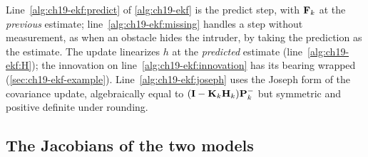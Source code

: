 \begin{algorithm}[htb]
\caption{One step of the extended Kalman filter}
\label{alg:ch19-ekf}
\end{algorithm}

Line~\ref{alg:ch19-ekf:predict} of \cref{alg:ch19-ekf} is the predict step,
with $\mathbf{F}_k$ at the \emph{previous} estimate; line~\ref{alg:ch19-ekf:missing}
handles a step without measurement, as when an obstacle hides the intruder,
by taking the prediction as the estimate. The update linearizes $h$ at the
\emph{predicted} estimate (line~\ref{alg:ch19-ekf:H}); the innovation on
line~\ref{alg:ch19-ekf:innovation} has its bearing wrapped
(\cref{sec:ch19-ekf-example}). Line~\ref{alg:ch19-ekf:joseph} uses the
Joseph form of the covariance update, algebraically equal to $(\mathbf{I} -
\mathbf{K}_k\mathbf{H}_k)\mathbf{P}_k^-$ but symmetric and positive definite under
rounding.

\subsection{The Jacobians of the two models}
\label{sec:ch19-ekf-jacobians}

